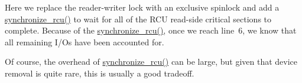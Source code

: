 Here we replace the reader-writer lock with an exclusive spinlock and
add a \url{synchronize_rcu()} to wait for all of the RCU read-side
critical sections to complete.
Because of the \url{synchronize_rcu()},
once we reach line~6, we know that all remaining I/Os have been accounted
for.

Of course, the overhead of \url{synchronize_rcu()} can be large,
but given that device removal is quite rare, this is usually a good
tradeoff.
